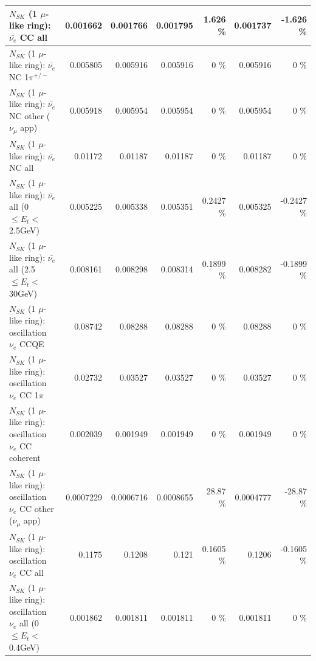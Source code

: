 \begin{table}
\begin{tabular}{| l | r | r | r  r | r  r |}
                            $N_{SK}$ (1 $\mu$-like ring): $\bar{\nu_{e}}$ CC all &        0.001662 &        0.001766 &        0.001795 &    1.626 \%  &        0.001737 &   -1.626 \%  \\ 
\hline
                     $N_{SK}$ (1 $\mu$-like ring): $\bar{\nu_e}$ NC 1$\pi^{+/-}$ &        0.005805 &        0.005916 &        0.005916 &        0 \%  &        0.005916 &        0 \%  \\ 
            $N_{SK}$ (1 $\mu$-like ring): $\bar{\nu_e}$ NC other ($\nu_\mu$ app) &        0.005918 &        0.005954 &        0.005954 &        0 \%  &        0.005954 &        0 \%  \\ 
                            $N_{SK}$ (1 $\mu$-like ring): $\bar{\nu_{e}}$ NC all &         0.01172 &         0.01187 &         0.01187 &        0 \%  &         0.01187 &        0 \%  \\ 
\hline
     $N_{SK}$ (1 $\mu$-like ring): $\bar{\nu_{e}}$ all (0 $\leq E_{t} <$ 2.5GeV) &        0.005225 &        0.005338 &        0.005351 &   0.2427 \%  &        0.005325 &  -0.2427 \%  \\ 
    $N_{SK}$ (1 $\mu$-like ring): $\bar{\nu_{e}}$ all (2.5 $\leq E_{t} <$ 30GeV) &        0.008161 &        0.008298 &        0.008314 &   0.1899 \%  &        0.008282 &  -0.1899 \%  \\ 
\hline
\hline
\hline
                          $N_{SK}$ (1 $\mu$-like ring): oscillation $\nu_e$ CCQE &         0.08742 &         0.08288 &         0.08288 &        0 \%  &         0.08288 &        0 \%  \\ 
                     $N_{SK}$ (1 $\mu$-like ring): oscillation $\nu_e$ CC 1$\pi$ &         0.02732 &         0.03527 &         0.03527 &        0 \%  &         0.03527 &        0 \%  \\ 
                   $N_{SK}$ (1 $\mu$-like ring): oscillation $\nu_e$ CC coherent &        0.002039 &        0.001949 &        0.001949 &        0 \%  &        0.001949 &        0 \%  \\ 
      $N_{SK}$ (1 $\mu$-like ring): oscillation $\nu_e$ CC other ($\nu_\mu$ app) &       0.0007229 &       0.0006716 &       0.0008655 &    28.87 \%  &       0.0004777 &   -28.87 \%  \\ 
                       $N_{SK}$ (1 $\mu$-like ring): oscillation $\nu_e$  CC all &          0.1175 &          0.1208 &           0.121 &   0.1605 \%  &          0.1206 &  -0.1605 \%  \\ 
\hline
$N_{SK}$ (1 $\mu$-like ring): oscillation $\nu_{e}$ all (0 $\leq E_{t} <$ 0.4GeV) &        0.001862 &        0.001811 &        0.001811 &        0 \%  &        0.001811 &        0 \%  \\ 

\end{tabular}
\end{table}
